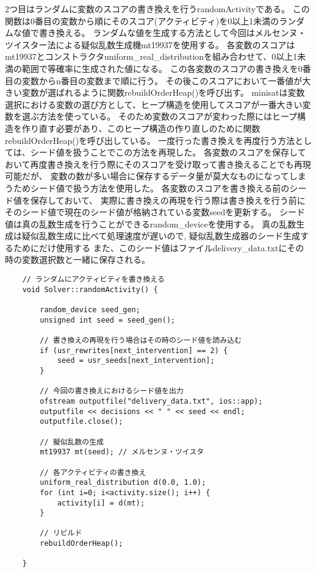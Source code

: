 2つ目はランダムに変数のスコアの書き換えを行うrandomActivityである。
この関数は0番目の変数から順にそのスコア(アクティビティ)を0以上1未満のランダムな値で書き換える。
ランダムな値を生成する方法として今回はメルセンヌ・ツイスター法による疑似乱数生成機mt19937を使用する。
各変数のスコアはmt19937とコンストラクタuniform\_real\_distributionを組み合わせて、0以上1未満の範囲で等確率に生成された値になる。
この各変数のスコアの書き換えを0番目の変数からn番目の変数まで順に行う。
その後このスコアにおいて一番値が大きい変数が選ばれるように関数rebuildOrderHeap()を呼び出す。
minisatは変数選択における変数の選び方として、ヒープ構造を使用してスコアが一番大きい変数を選ぶ方法を使っている。
そのため変数のスコアが変わった際にはヒープ構造を作り直す必要があり、このヒープ構造の作り直しのために関数rebuildOrderHeap()を呼び出している。
一度行った書き換えを再度行う方法としては、シード値を扱うことでこの方法を再現した。
各変数のスコアを保存しておいて再度書き換えを行う際にそのスコアを受け取って書き換えることでも再現可能だが、
変数の数が多い場合に保存するデータ量が莫大なものになってしまうためシード値で扱う方法を使用した。
各変数のスコアを書き換える前のシード値を保存しておいて、
実際に書き換えの再現を行う際は書き換えを行う前にそのシード値で現在のシード値が格納されている変数seedを更新する。
シード値は真の乱数生成を行うことができるrandom\_deviceを使用する。
真の乱数生成は疑似乱数生成に比べて処理速度が遅いので, 疑似乱数生成器のシード生成するためにだけ使用する
また、このシード値はファイルdelivery\_data.txtにその時の変数選択数と一緒に保存される。
\begin{lstlisting}
	// ランダムにアクティビティを書き換える
	void Solver::randomActivity() {

    	random_device seed_gen;
    	unsigned int seed = seed_gen();

		// 書き換えの再現を行う場合はその時のシード値を読み込む
    	if (usr_rewrites[next_intervention] == 2) {
    	    seed = usr_seeds[next_intervention];
    	}

		// 今回の書き換えにおけるシード値を出力
    	ofstream outputfile("delivery_data.txt", ios::app);
    	outputfile << decisions << " " << seed << endl;
    	outputfile.close();

    	// 擬似乱数の生成
    	mt19937 mt(seed); // メルセンヌ・ツイスタ

    	// 各アクティビティの書き換え
    	uniform_real_distribution d(0.0, 1.0);
    	for (int i=0; i<activity.size(); i++) {
    	    activity[i] = d(mt);
    	}
    
    	// リビルド
    	rebuildOrderHeap();

	}
\end{lstlisting}

